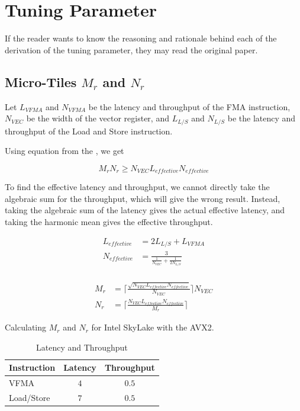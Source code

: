 \section{Tuning Parameter}

If the reader wants to know the reasoning and rationale 
behind each of the derivation of the tuning parameter, 
they may read the original \cite{BLIS} paper.

\subsection{Micro-Tiles $M_r$ and $N_r$}
\label{sec:mr_nr_calculation}

Let $L_{VFMA}$ and $N_{VFMA}$ be the latency and throughput of the FMA instruction, 
$N_{VEC}$ be the width of the vector register, and
$L_{L/S}$ and $N_{L/S}$ be the latency and throughput of 
the Load and Store instruction.

Using equation from the \cite{BLIS}, we get

\begin{equation}
    M_rN_r \geq N_{VEC} L_{effective} N_{effective}
\end{equation}

To find the effective latency and throughput, we cannot directly take the 
algebraic sum for the throughput, which will give the wrong result. Instead, taking the 
algebraic sum of the latency gives the actual effective latency, 
and taking the harmonic mean gives the effective throughput.

\begin{align*}
    L_{effective} &= 2L_{L/S} + L_{VFMA}\\
    N_{effective} &= \frac{3}{ \frac{1}{N_{VEC}} + \frac{1}{2N_{L/S}} } \\
\end{align*}

\begin{align*}
    M_r &= \lceil \frac{ \sqrt{N_{VEC} L_{effective} N_{effective}} }{N_{VEC}} \rceil N_{VEC} \\
    N_r &= \lceil \frac{ N_{VEC} L_{effective} N_{effective} }{M_r} \rceil
\end{align*}


Calculating $M_r$ and $N_r$ for Intel SkyLake with the AVX2.

\begin{table}[ht]
    \centering
    \caption{Latency and Throughput}
    \begin{tabular}{|l|c|c|}
        \hline
        \textbf{Instruction} & \textbf{Latency} & \textbf{Throughput}\\
        \hline
        VFMA        & $4$ & $0.5$ \\
        \hline
        Load/Store  & $7$ & $0.5$ \\
        \hline
    \end{tabular}
\end{table}

